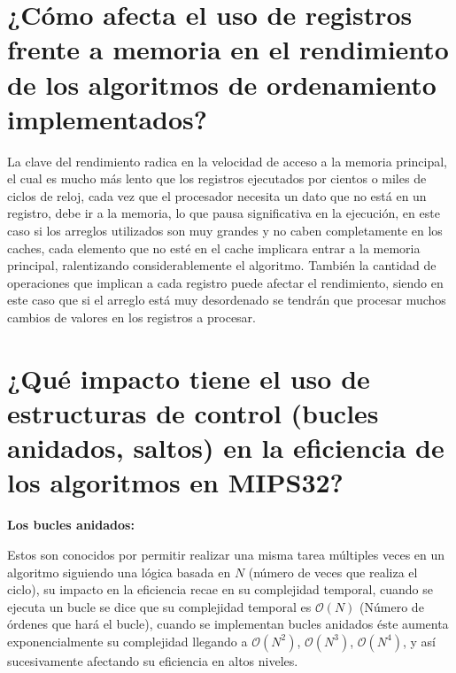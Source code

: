 \documentclass{article}
\begin{document}
\quad
\newpage








\section{¿Cómo afecta el uso de registros frente a memoria en el rendimiento de los algoritmos de ordenamiento implementados?}

\quad

{ La clave del rendimiento radica en la velocidad de acceso a la memoria principal, el cual es mucho más lento que los registros ejecutados por cientos o miles de ciclos de reloj, cada vez que el procesador necesita un dato que no está en un registro, debe ir a la memoria, lo que pausa significativa en la ejecución, en este caso si los arreglos utilizados son muy grandes y no caben completamente en los caches, cada elemento que no esté en el cache implicara entrar a la memoria principal, ralentizando considerablemente el algoritmo. También la cantidad de operaciones que implican a cada registro puede afectar el rendimiento, siendo en este caso que si el arreglo está muy desordenado se tendrán que procesar muchos cambios de valores en los registros a procesar.}

\quad
\newpage










\section{¿Qué impacto tiene el uso de estructuras de control (bucles anidados, saltos) en la eficiencia de los algoritmos en MIPS32?}

\quad

\textbf{Los bucles anidados: }

\quad

{Estos son conocidos por permitir realizar una misma tarea múltiples veces en un algoritmo siguiendo una lógica basada en $N$ (número de veces que realiza el ciclo), su impacto en la eficiencia recae en su complejidad temporal, cuando se ejecuta un bucle se dice que su complejidad temporal es $\mathcal{O}(N)$ (Número de órdenes que hará el bucle), cuando se implementan bucles anidados éste aumenta exponencialmente su complejidad llegando a $\mathcal{O}(N^2)$, $\mathcal{O}(N^3)$, $\mathcal{O}(N^4)$, y así sucesivamente afectando su eficiencia en altos niveles.}
\end{document}
